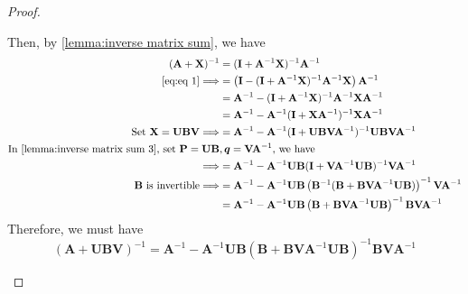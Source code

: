 \documentclass[13pt]{article}
\theoremstyle{definition}
\theoremstyle{remark}
\begin{document}
\begin{proof}
\begin{enumerate}[label=(\alph*)]
\begin{enumerate}[label=(\roman*)]
            Then, by \cref{lemma:inverse matrix sum}, we have
            \begin{align*}(\mathbf{A}+\mathbf{\mathbf{X}})^{-1} &=(\mathbf{\mathbf{I}}+\mathbf{A}^{-1}\mathbf{\mathbf{X}})^{-1}\mathbf{A}^{-1} \\
            \cref{eq:eq 1}\Longrightarrow&= \left(\mathbf{\mathbf{I}}-(\mathbf{\mathbf{I}}+\mathbf{A}^{-1}\mathbf{\mathbf{X}})^{-1}\mathbf{A}^{-1}\mathbf{\mathbf{X}}\right)\mathbf{A}^{-1}\\
            &= \mathbf{A}^{-1} - (\mathbf{\mathbf{I}}+\mathbf{A}^{-1}\mathbf{\mathbf{X}})^{-1}\mathbf{A}^{-1}\mathbf{\mathbf{X}}\mathbf{A}^{-1}\\
            &= \mathbf{A}^{-1} - \mathbf{A}^{-1}(\mathbf{\mathbf{I}}+\mathbf{\mathbf{X}}\mathbf{A}^{-1})^{-1}\mathbf{\mathbf{X}}\mathbf{A}^{-1}\\
            \text{Set~} \mathbf{\mathbf{X}}=\mathbf{U}\mathbf{B}\mathbf{\mathbf{V}}\Longrightarrow&=\mathbf{A}^{-1} - \mathbf{A}^{-1}(\mathbf{\mathbf{I}}+\mathbf{U}\mathbf{B}\mathbf{\mathbf{V}}\mathbf{A}^{-1})^{-1}\mathbf{U}\mathbf{B}\mathbf{\mathbf{V}}\mathbf{A}^{-1}\\
            \text{In \cref{lemma:inverse matrix sum 3}, set~} \mathbf{\mathbf{P}}=\mathbf{U}\mathbf{B}&, \bm{q}=\mathbf{\mathbf{V}}\mathbf{A}^{-1}
            \text{, we have}\\
            \Longrightarrow
            &=\mathbf{A}^{-1} - \mathbf{A}^{-1}\mathbf{U}\mathbf{B}(\mathbf{\mathbf{I}}+\mathbf{\mathbf{V}}\mathbf{A}^{-1}\mathbf{U}\mathbf{B})^{-1}\mathbf{\mathbf{V}}\mathbf{A}^{-1}\\
            \mathbf{B}~\text{is invertible}\Longrightarrow&=\mathbf{\mathbf{A}}^{-1}-\mathbf{\mathbf{A}}^{-1} \mathbf{U \mathbf{B}}\left(\mathbf{B}^{-1}(\mathbf{\mathbf{B}}+\mathbf{\mathbf{B} \mathbf{V} \mathbf{A}}^{-1} \mathbf{U \mathbf{B}})\right)^{-1} \mathbf{ \mathbf{V} \mathbf{A}}^{-1}\\
            &=\mathbf{\mathbf{A}}^{-1}-\mathbf{\mathbf{A}}^{-1} \mathbf{U \mathbf{B}}\left(\mathbf{\mathbf{B}}+\mathbf{\mathbf{B} \mathbf{V} \mathbf{A}}^{-1} \mathbf{U \mathbf{B}}\right)^{-1} \mathbf{\mathbf{B} \mathbf{V} \mathbf{A}}^{-1}
            \end{align*}
        Therefore, we must have
        \[
        (\mathbf{\mathbf{A}}+\mathbf{U} \mathbf{B} \mathbf{\mathbf{V}})^{-1}=\mathbf{\mathbf{A}}^{-1}-\mathbf{\mathbf{A}}^{-1} \mathbf{U \mathbf{B}}\left(\mathbf{\mathbf{B}}+\mathbf{\mathbf{B} \mathbf{V} \mathbf{A}}^{-1} \mathbf{U \mathbf{B}}\right)^{-1} \mathbf{\mathbf{B} \mathbf{V} \mathbf{A}}^{-1}
\]
\end{enumerate}
\end{enumerate}
\end{proof}
\end{document}

